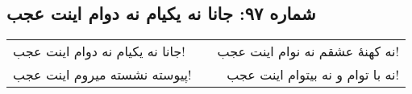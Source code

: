 \begin{center}
\section*{شماره ۹۷: جانا نه یکیام نه دوام اینت عجب}
\label{sec:097}
\begin{longtable}{l p{0.5cm} r}
جانا نه یکیام نه دوام اینت عجب!
&&
نه کهنهٔ عشقم نه نوام اینت عجب!
\\
پیوسته نشسته میروم اینت عجب!
&&
نه با توام و نه بیتوام اینت عجب!
\\
\end{longtable}
\end{center}
